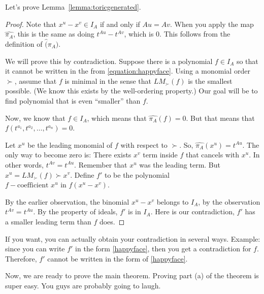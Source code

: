Let's prove Lemma~\ref{lemma:toricgenerated}.

\begin{proof}
Note that $x^u - x^v \in I_A$ if and only if $Au = Av$. When you apply the map $\widehat{\pi_A}$, this is the same as doing $t^{Au} - t^{Av}$, which is $0$. This follows from the definition of $\widehat(\pi_A)$.

We will prove this by contradiction. Suppose there is a polynomial $f \in I_A$ so that it cannot be written in the from \eqref{equation:happyface}. Using a monomial order $\succ$, assume that $f$ is minimal in the sense that $LM_\succ(f)$ is the smallest possible. (We know this exists by the well-ordering property.) Our goal will be to find polynomial that is even ``smaller'' than $f$.

Now, we know that $f \in I_A$, which means that $\widehat{\pi_A}(f) = 0$. But that means that $f(t^{a_1}, t^{a_2}, \ldots, t^{a_n}) = 0$.

Let $x^u$ be the leading monomial of $f$ with respect to $\succ$. 
So, $\widehat{\pi_A}(x^u) = t^{Au}$.
The only way to become zero is: There exists $x^v$ term inside $f$ that cancels with $x^u$.
In other words, $t^{Av} = t^{Au}$.
Remember that $x^u$ was the leading term.
But $x^u = LM_\succ(f) \succ x^v$. Define $f'$ to be the polynomial $f - \text{coefficient } x^u \text{ in } f (x^u - x^v)$.

By the earlier observation, the binomial $x^u - x^v$ belongs to $I_A$, by the observation $t^{Av} = t^{Au}$. By the property of ideals, $f'$ is in $I_A$. Here is our contradiction, $f'$ has a smaller leading term than $f$ does.
\end{proof}

If you want, you can actually obtain your contradiction in several ways. Example: since you can write $f'$ in the form \eqref{happyface}, then you get a contradiction for $f$. Therefore, $f'$ cannot be written in the form of \eqref{happyface}.

Now, we are ready to prove the main theorem.
Proving part (a) of the theorem is super easy. You guys are probably going to laugh.

